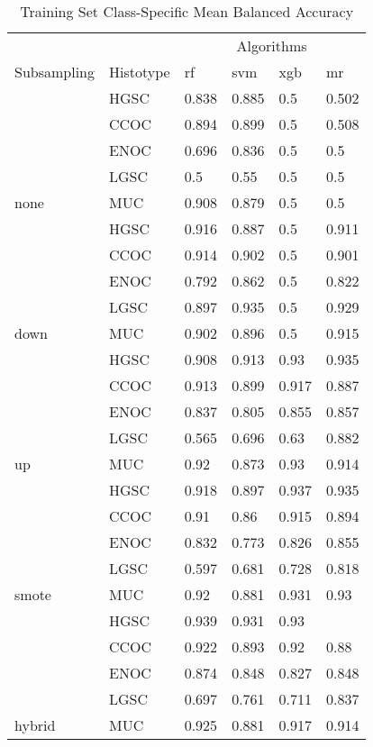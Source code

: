 \documentclass[
]{report}
\begin{document}
\begin{table}

\caption{\label{tab:train-bal-accuracy-class-table}Training Set Class-Specific Mean Balanced Accuracy}
\centering
\begin{tabular}[t]{l|l|l|l|l|l}
\hline
\multicolumn{2}{c|}{ } & \multicolumn{4}{c}{Algorithms} \\
\cline{3-6}
Subsampling & Histotype & rf & svm & xgb & mr\\
\hline
 & HGSC & 0.838 & 0.885 & 0.5 & 0.502\\
\cline{2-6}
 & CCOC & 0.894 & 0.899 & 0.5 & 0.508\\
\cline{2-6}
 & ENOC & 0.696 & 0.836 & 0.5 & 0.5\\
\cline{2-6}
 & LGSC & 0.5 & 0.55 & 0.5 & 0.5\\
\cline{2-6}
\multirow{-5}{*}{\raggedright\arraybackslash none} & MUC & 0.908 & 0.879 & 0.5 & 0.5\\
\cline{1-6}
 & HGSC & 0.916 & 0.887 & 0.5 & 0.911\\
\cline{2-6}
 & CCOC & 0.914 & 0.902 & 0.5 & 0.901\\
\cline{2-6}
 & ENOC & 0.792 & 0.862 & 0.5 & 0.822\\
\cline{2-6}
 & LGSC & 0.897 & 0.935 & 0.5 & 0.929\\
\cline{2-6}
\multirow{-5}{*}{\raggedright\arraybackslash down} & MUC & 0.902 & 0.896 & 0.5 & 0.915\\
\cline{1-6}
 & HGSC & 0.908 & 0.913 & 0.93 & 0.935\\
\cline{2-6}
 & CCOC & 0.913 & 0.899 & 0.917 & 0.887\\
\cline{2-6}
 & ENOC & 0.837 & 0.805 & 0.855 & 0.857\\
\cline{2-6}
 & LGSC & 0.565 & 0.696 & 0.63 & 0.882\\
\cline{2-6}
\multirow{-5}{*}{\raggedright\arraybackslash up} & MUC & 0.92 & 0.873 & 0.93 & 0.914\\
\cline{1-6}
 & HGSC & 0.918 & 0.897 & 0.937 & 0.935\\
\cline{2-6}
 & CCOC & 0.91 & 0.86 & 0.915 & 0.894\\
\cline{2-6}
 & ENOC & 0.832 & 0.773 & 0.826 & 0.855\\
\cline{2-6}
 & LGSC & 0.597 & 0.681 & 0.728 & 0.818\\
\cline{2-6}
\multirow{-5}{*}{\raggedright\arraybackslash smote} & MUC & 0.92 & 0.881 & 0.931 & 0.93\\
\cline{1-6}
 & HGSC & 0.939 & 0.931 & 0.93 & \cellcolor[HTML]{90ee90}{0.941}\\
\cline{2-6}
 & CCOC & 0.922 & 0.893 & 0.92 & 0.88\\
\cline{2-6}
 & ENOC & 0.874 & 0.848 & 0.827 & 0.848\\
\cline{2-6}
 & LGSC & 0.697 & 0.761 & 0.711 & 0.837\\
\cline{2-6}
\multirow{-5}{*}{\raggedright\arraybackslash hybrid} & MUC & 0.925 & 0.881 & 0.917 & 0.914\\
\hline
\end{tabular}
\end{table}
\end{document}
